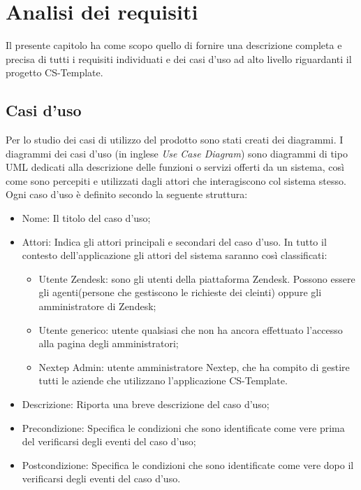 
\chapter{Analisi dei requisiti}
\label{cap:analisi-requisiti}
Il presente capitolo ha come scopo quello di fornire una descrizione completa e precisa di tutti i requisiti individuati e dei casi d’uso ad alto livello riguardanti il progetto CS-Template.

\section{Casi d'uso}

Per lo studio dei casi di utilizzo del prodotto sono stati creati dei diagrammi.
I diagrammi dei casi d'uso (in inglese \emph{Use Case Diagram}) sono diagrammi di tipo \gls{UML} dedicati alla descrizione delle funzioni o servizi offerti da un sistema, così come sono percepiti e utilizzati dagli attori che interagiscono col sistema stesso.
Ogni caso d’uso è definito secondo la seguente struttura:
\begin{itemize}
	\item Nome: Il titolo del caso d’uso;
	\item Attori: Indica gli attori principali e secondari del caso d’uso. In tutto il contesto
	dell’applicazione gli attori del sistema saranno così classificati:
	\begin{itemize}
		\item Utente Zendesk: sono gli utenti della piattaforma Zendesk. Possono essere gli agenti(persone che gestiscono le richieste dei cleinti) oppure gli amministratore di Zendesk;
		\item Utente generico: utente qualsiasi che non ha ancora effettuato l'accesso alla pagina degli amministratori;
		 \item Nextep Admin: utente amministratore Nextep, che ha compito di gestire tutti le aziende che utilizzano l'applicazione CS-Template.
	\end{itemize}

	\item Descrizione: Riporta una breve descrizione del caso d’uso;
	\item Precondizione: Specifica le condizioni che sono identificate come vere prima
	del verificarsi degli eventi del caso d’uso;
	\item Postcondizione: Specifica le condizioni che sono identificate come vere dopo il
	verificarsi degli eventi del caso d’uso.

\end{itemize}

